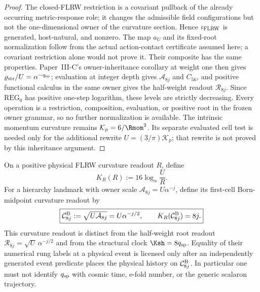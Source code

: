 \documentclass[12pt,a4paper]{article}
\begin{document}
\begin{proof}
The closed-FLRW restriction is a covariant pullback of the already occurring
metric-response role; it changes the admissible field configurations but not
the one-dimensional owner of the curvature section.  Hence
\(\iota_{\rm FLRW}\) is generated, host-natural, and nonzero.  The map \(a_U\)
and its fixed-root normalization follow from the actual action-contact
certificate assumed here; a covariant restriction alone would not prove it.  Their composite has
the same properties.  Paper~III-C's owner-inheritance corollary at weight one
then gives \(\varrho_{\rm str}/U=\alpha^{-q_{\rm sp}}\); evaluation at integer
depth gives \(\mathcal A_{8j}\) and \(C_{56}\), and positive functional
calculus in the same owner gives the half-weight readout \(\mathcal R_{8j}\).
Since \(\mathrm{REG}_0\) has positive one-step logarithm, these levels are
strictly decreasing.  Every operation is a restriction, composition,
evaluation, or positive root in the frozen owner grammar, so no further
normalization is available.  The intrinsic momentum curvature remains $\mathcal K_p=6/\Rmom^2$. Its separate evaluated cell test is needed only for the additional rewrite $U=(3/\pi)\mathcal K_p$; that rewrite is not proved by this inheritance argument.
\end{proof}

\begin{definition}
\label{p8:def:curvature-shell-coordinate}
On a positive physical FLRW curvature readout \(R\), define
\begin{equation}
\label{p8:eq:curvature-shell-coordinate}
 \boxed{K_R(R):=16\log_\alpha\!\frac{U}{R}.}
\end{equation}
For a hierarchy landmark with owner scale
\(\mathcal A_{8j}=U\alpha^{-j}\), define its first-cell Born-midpoint curvature
readout by
\begin{equation}
\label{p8:eq:born-midpoint-curvature-readout}
 \boxed{\mathcal C^{\rm B}_{8j}:=\sqrt{U\mathcal A_{8j}}
 =U\alpha^{-j/2},\qquad K_R(\mathcal C^{\rm B}_{8j})=8j.}
\end{equation}
This curvature readout is distinct from the half-weight root readout
\(\mathcal R_{8j}=\sqrt U\,\alpha^{-j/2}\) and from the structural clock
\(\Ksh=8q_{\rm sp}\).  Equality of their numerical rung labels at a physical
event is licensed only after an independently generated event predicate places
the physical history on \(\mathcal C^{\rm B}_{8j}\).  In particular one must
not identify \(q_{\rm sp}\) with cosmic time, e-fold number, or the generic
scalaron trajectory.
\end{definition}
\end{document}
